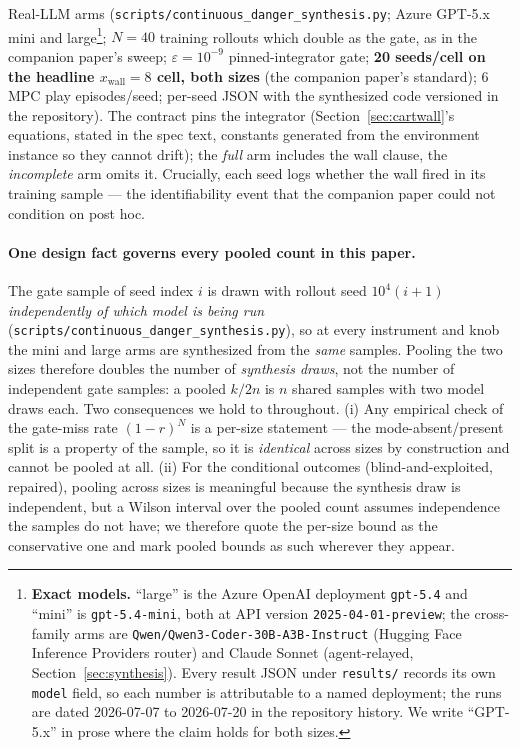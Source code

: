 \documentclass[11pt]{article}
\theoremstyle{definition}
\theoremstyle{remark}
\begin{document}
Real-LLM arms (\texttt{scripts/continuous\_danger\_synthesis.py}; Azure GPT-5.x mini and large\footnote{\textbf{Exact models.} ``large'' is the Azure OpenAI deployment \texttt{gpt-5.4} and ``mini'' is \texttt{gpt-5.4-mini}, both at API version \texttt{2025-04-01-preview}; the cross-family arms are \texttt{Qwen/Qwen3-Coder-30B-A3B-Instruct} (Hugging Face Inference Providers router) and Claude Sonnet (agent-relayed, Section~\ref{sec:synthesis}). Every result JSON under \texttt{results/} records its own \texttt{model} field, so each number is attributable to a named deployment; the runs are dated 2026-07-07 to 2026-07-20 in the repository history. We write ``GPT-5.x'' in prose where the claim holds for both sizes.}; $N = 40$ training rollouts which double as the gate, as in the companion paper's sweep; $\varepsilon = 10^{-9}$ pinned-integrator gate; \textbf{20 seeds/cell on the headline $x_\mathrm{wall} = 8$ cell, both sizes} (the companion paper's standard); 6 MPC play episodes/seed; per-seed JSON with the synthesized code versioned in the repository). The contract pins the integrator (Section~\ref{sec:cartwall}'s equations, stated in the spec text, constants generated from the environment instance so they cannot drift); the \emph{full} arm includes the wall clause, the \emph{incomplete} arm omits it. Crucially, each seed logs whether the wall fired in its training sample --- the identifiability event that the companion paper could not condition on post hoc.

\paragraph{One design fact governs every pooled count in this paper.} The gate sample of seed index $i$ is drawn with rollout seed $10^4(i{+}1)$ \emph{independently of which model is being run} (\texttt{scripts/continuous\_danger\_synthesis.py}), so at every instrument and knob the mini and large arms are synthesized from the \emph{same} samples. Pooling the two sizes therefore doubles the number of \emph{synthesis draws}, not the number of independent gate samples: a pooled $k/2n$ is $n$ shared samples with two model draws each. Two consequences we hold to throughout. (i) Any empirical check of the gate-miss rate $(1-r)^N$ is a per-size statement --- the mode-absent/present split is a property of the sample, so it is \emph{identical} across sizes by construction and cannot be pooled at all. (ii) For the conditional outcomes (blind-and-exploited, repaired), pooling across sizes is meaningful because the synthesis draw is independent, but a Wilson interval over the pooled count assumes independence the samples do not have; we therefore quote the per-size bound as the conservative one and mark pooled bounds as such wherever they appear.
\end{document}
